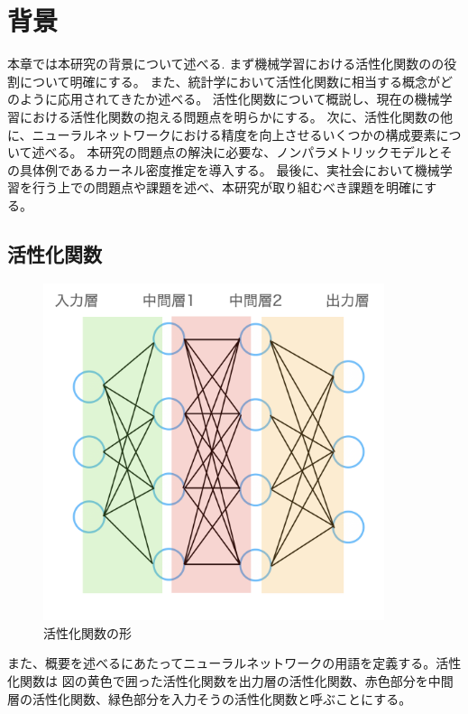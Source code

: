 \chapter{背景}
\label{background}

本章では本研究の背景について述べる.
まず機械学習における活性化関数のの役割について明確にする。
また、統計学において活性化関数に相当する概念がどのように応用されてきたか述べる。
活性化関数について概説し、現在の機械学習における活性化関数の抱える問題点を明らかにする。
次に、活性化関数の他に、ニューラルネットワークにおける精度を向上させるいくつかの構成要素について述べる。
本研究の問題点の解決に必要な、ノンパラメトリックモデルとその具体例であるカーネル密度推定を導入する。
最後に、実社会において機械学習を行う上での問題点や課題を述べ、本研究が取り組むべき課題を明確にする。



\section{活性化関数}

\begin{figure}[hbtp]
    \begin{center}
        \includegraphics[width=10cm]{asset/neural_network1.png}
            \caption{活性化関数の形}
            \label{neural_network1}
    \end{center}
\end{figure}

また、概要を述べるにあたってニューラルネットワークの用語を定義する。活性化関数は
図の黄色で囲った活性化関数を出力層の活性化関数、赤色部分を中間層の活性化関数、緑色部分を入力そうの活性化関数と呼ぶことにする。

